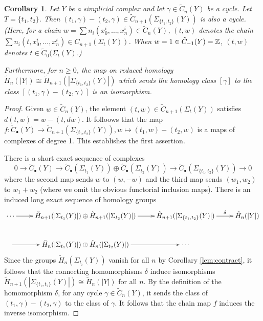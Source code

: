 \documentclass[12pt]{amsart}
\newtheorem{cor}[lem]{Corollary}
\theoremstyle{definition}
\newcommand{\Z}{\Bbb{Z}}
\newcommand{\<}{\langle}
\renewcommand{\>}{\rangle}
\newcommand{\mc}[2]{\Sigma_{#1}(#2)}
\begin{document}
\begin{cor}\label{cor:susp} Let $Y$ be a simplicial complex and let $\gamma\in \tilde{C}_n(Y)$ be a cycle. Let $T=\{ t_1,t_2\}$. Then $(t_1,\gamma)-(t_2,\gamma)\in \tilde{C}_{n+1}(\mc{\{ t_1,t_2\}}{Y})$ 
is also a cycle. (Here, for a chain $w=\sum n_i(x^i_0,\ldots,x^i_n)\in \tilde{C}_n(Y)$, $(t,w)$ denotes the chain $\sum n_i(t,x^i_0,\ldots,x^i_n)\in C_{n+1}(\mc{t}{Y})$. When $w=1\in \tilde{C}_{-1}(Y)=\Z$, $(t,w)$ denotes $t\in \tilde{C}_0(\mc{t}{Y}$.)

Furthermore, for $n\geq 0$, the map on reduced homology $\tilde{H}_n(|Y|)\cong \tilde{H}_{n+1}(|\mc{\{ t_1,t_2\}}{Y}|)$  which sends the homology class $[\gamma]$ to the class
$[(t_1,\gamma)-(t_2,\gamma)]$ is an isomorphism.
\end{cor}

\begin{proof}
Given $w\in \tilde{C}_n(Y)$, the element $(t,w)\in \tilde{C}_{n+1}(\mc{t}{Y})$ satisfies $d(t,w)=w-(t,dw)$.  It folloows that the map $f:\tilde{C}_\bullet(Y)\to \tilde{C}_{n+1}(\mc{\{ t_1,t_2\}}{Y}), w\mapsto (t_1,w)-(t_2,w)$ is a maps of complexes of degree 1. This establishes the first assertion.

There is a short exact sequence of complexes
\[
0\to\tilde{C}_\bullet(Y)\to\tilde{C}_\bullet(\mc{t_1}{Y})\oplus\tilde{C}_\bullet(\mc{t_2}{Y})\to\tilde{C}_\bullet(\mc{\{ t_1,t_2\}}{Y})\to 0
\]
where the second map sends $w$ to $(w,-w)$ and the third map sends $(w_1,w_2)$ to $w_1+w_2$ (where we omit the obvious functorial inclusion maps). There is an induced long exact sequence of homology groups
\[
\xymatrix{
\cdots\ar[r]&\tilde{H}_{n+1}(|\mc{t_1}{Y}|)\oplus\tilde{H}_{n+1}(|\mc{t_2}{Y}|)\ar[r]&\tilde{H}_{n+1}(|\mc{\{ t_1,t_2\}}{Y}|)\ar^-{\delta}[r]&\tilde{H}_n(|Y|)\\
\ar[r]
&\tilde{H}_{n}(|\mc{t_1}{Y}|)\oplus\tilde{H}_{n}(|\mc{t_2}{Y}|)\ar[r]&\cdots&\\
}
\]
Since the groups $\tilde{H}_n(\mc{t_i}{Y})$ vanish for all $n$ by Corollary \ref{lem:contract}, it follows that the connecting homomorphisms $\delta$ induce isomorphisms 
$\tilde{H}_{n+1}(|\mc{\{ t_1,t_2\}}{Y}|)\cong \tilde{H}_n(|Y|)$ for all $n$. By the definition of the homomorphism $\delta$, for any cycle $\gamma\in \tilde{C}_n(Y)$, it sends the class of $(t_1,\gamma)-(t_2,\gamma)$ to the class of $\gamma$. It follows that the chain map $f$ induces the inverse isomorphism.
\end{proof}
\end{document}
